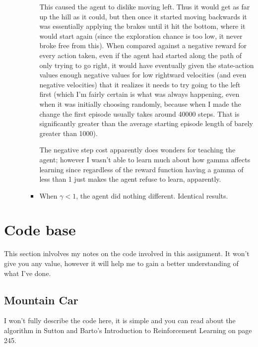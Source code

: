 \documentclass{article}
\begin{document}
\begin{enumerate}
\begin{enumerate}
\begin{itemize}
                This caused the agent to dislike moving left. Thus it would get as far up the hill as it could, but then once it started moving backwards it was
                essentially applying the brakes until it hit the bottom, where it would start again (since the exploration chance is too low, it never broke free
                from this). When compared against a negative reward for every action taken, even if the agent had started along the path of only trying to go right, it would have
                eventually given the state-action values enough negative values for low rightward velocities (and even negative velocities) that it realizes it needs to try going to
                the left first (which I'm fairly certain is what was always happening, even when it was initially choosing randomly, because when I made
                the change the first episode usually takes around 40000 steps. That is significantly greater than the average starting episode length of barely greater than
                1000). 

                The negative step cost apparently does wonders for teaching the agent; however I wasn't able to learn much about how gamma affects learning
                since regardless of the reward function having a gamma of less than 1 just makes the agent refuse to learn, apparently. 

            \item When $ \gamma < 1 $, the agent did nothing different. Identical results. 


        \end{itemize}
\end{enumerate}

\end{enumerate}


\section{Code base}


This section inlvolves my notes on the code involved in this assignment. 
It won't give you any value, however it will help me to gain a better
understanding of what I've done.

\subsection{Mountain Car}
I won't fully describe the code here, it is simple and you can read about the algorithm in Sutton and
Barto's Introduction to Reinforcement Learning on page 245. 
\end{document}
